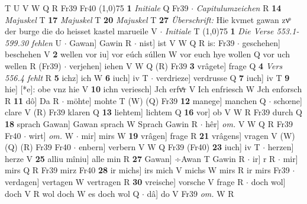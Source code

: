 \documentclass[8pt,a4paper,notitlepage]{article}
\begin{document}
\begin{table}[ht]
\begin{minipage}[t]{0.5\linewidth}
T U V W Q R Fr39 Fr40 \newline
\line(1,0){75} \newline
\textbf{1} \textit{Initiale} Q Fr39   $\cdot$ \textit{Capitulumzeichen} R  \textbf{14} \textit{Majuskel} T  \textbf{17} \textit{Majuskel} T  \textbf{20} \textit{Majuskel} T  \textbf{27} \textit{Überschrift:} Hie kvmet gawan zvͦ der burge die do heisset kastel marueile V   $\cdot$ \textit{Initiale} T  \newline
\line(1,0){75} \newline
\textbf{1} \textit{Die Verse 553.1-599.30 fehlen} U   $\cdot$ Gawan] Gawin R  $\cdot$ nist] ist V W Q R is: Fr39  $\cdot$ geschehen] beschehen V \textbf{2} wellen vor iu] vor eúch súllen W vor euch hye wollen Q vor uch wellen R (Fr39)  $\cdot$ verjehen] iehen V W Q (R) Fr39 \textbf{3} vrâgete] frage Q \textbf{4} \textit{Vers 556.4 fehlt} R  \textbf{5} ichz] ich W \textbf{6} iuch] iv T  $\cdot$ verdrieze] verdrusse Q \textbf{7} iuch] iv T \textbf{9} hie] [*e]: obe vnz hie V \textbf{10} ichn veriesch] Jch erfvͦr V Ich enfriesch W Jch enforsch R \textbf{11} dô] Da R  $\cdot$ möhte] mohte T (W) (Q) Fr39 \textbf{12} manege] manchen Q  $\cdot$ schœne] clare V (R) Fr39 klaren Q \textbf{13} liehtem] lichtem Q \textbf{16} vor] ob V W R Fr39 durch Q \textbf{18} sprach Gawan] Gawan sprach W Sprach Gawin R  $\cdot$ hêr] \textit{om.} V W Q R Fr39 Fr40  $\cdot$ wirt] \textit{om.} W  $\cdot$ mir] mirs W \textbf{19} vrâgen] frage R \textbf{21} vrâgens] vragen V (W) (Q) (R) Fr39 Fr40  $\cdot$ enbern] verbern V W Q Fr39 (Fr40) \textbf{23} iuch] iv T  $\cdot$ herzen] herze V \textbf{25} alliu mîniu] alle min R \textbf{27} Gawan] ÷Awan T Gawin R  $\cdot$ ir] r R  $\cdot$ mir] mirs Q R Fr39 mirz Fr40 \textbf{28} ir michs] irs mich V michs W mirs R ir mirs Fr39  $\cdot$ verdagen] vertagen W vertragen R \textbf{30} vreische] vorsche V frage R  $\cdot$ doch wol] doch V R wol doch W es doch wol Q  $\cdot$ dâ] do V Fr39 \textit{om.} W R \newline
\end{minipage}
\end{table}
\end{document}
